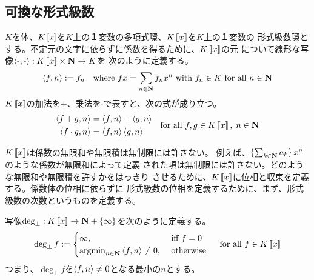 {\subsection{可換な形式級数}\label{s2:可換な形式級数} %
	$K$を体、$K\mathinner{[{x}]}$を$K$上の１変数の多項式環、$K\mathinner{[\![{x}]\!]}$を$K$上の１変数の
	形式級数環とする。不定元の文字に依らずに係数を得るために、$K\mathinner{[\![{x}]\!]}$の元
	について線形な写像$\dlr{\here,\here}:K\bblr{x}\times\sizen\to K$を
	次のように定義する。
	\begin{equation*}\begin{split}
		\mathinner{\langle{f,n}\rangle} := f_n \quad\text{where } fx = \sum_{n\in\mathbf{N}} f_nx^n
		\text{ with } f_n\in K \text{ for all } n\in\mathbf{N}
	\end{split}\end{equation*}
	$K\mathinner{[\![{x}]\!]}$の加法を$+$、乗法を$\cdot$で表すと、次の式が成り立つ。
	\begin{equation*}\begin{split}
		\mathinner{\langle{f + g, n}\rangle} &= \mathinner{\langle{f, n}\rangle} + \mathinner{\langle{g, n}\rangle} \\
		\mathinner{\langle{f \cdot g, n}\rangle} &= \mathinner{\langle{f, n}\rangle}\mathinner{\langle{g, n}\rangle} \\
	\end{split}
	\quad\text{for all } f,g\in K\mathinner{[\![{x}]\!]},\; n\in\mathbf{N}
	\end{equation*}

	$K\mathinner{[\![{x}]\!]}$は係数の無限和や無限積は無制限には許さない。
	例えば、$\mathinner{\{{\sum_{k\in\ensuremath{\mathbf{N}}}a_k}\}}x^n$のような係数が無限和によって定義
	された項は無制限には許さない。どのような無限和や無限積を許すかをはっきり
	させるために、$K\mathinner{[\![{x}]\!]}$に位相と収束を定義する。係数体の位相に依らずに
	形式級数の位相を定義するために、まず、形式級数の次数というものを定義する。

	\begin{definition}[形式級数の次数]\label{def:形式級数の次数} %
		写像$\deg_\bot:K\mathinner{[\![{x}]\!]}\to\mathbf{N}+\mathinner{\{{\infty}\}}$を次のように定義する。
		\begin{equation*}\begin{split}
			\deg_\bot f := \begin{cases}
				\infty, &\text{ iff } f = 0 \\
				\mathinner{\operatorname{argmin}}_{n\in\mathbf{N}} \mathinner{\langle{f,n}\rangle}\neq0, &\text{ otherwise } \\
			\end{cases} \quad\text{for all } f\in K\mathinner{[\![{x}]\!]}
		\end{split}\end{equation*}
		つまり、$\deg_\bot f$を$\mathinner{\langle{f,n}\rangle}\neq0$となる最小の$n$とする。\EOP
	\end{definition} %

}
